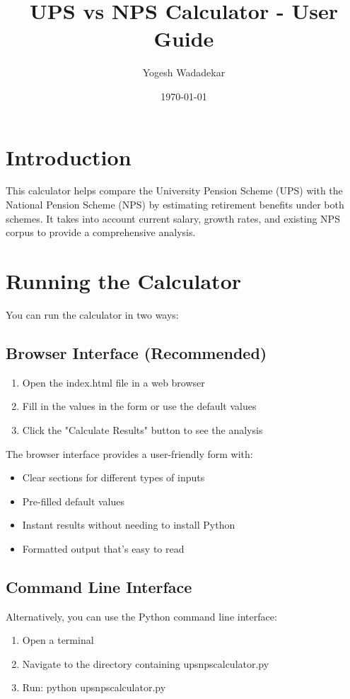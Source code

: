 \documentclass{article}
\title{UPS vs NPS Calculator - User Guide}
\author{Yogesh Wadadekar}
\date{\today}
\begin{document}
\maketitle

\section{Introduction}
This calculator helps compare the University Pension Scheme (UPS) with the National Pension Scheme (NPS) by estimating retirement benefits under both schemes. It takes into account current salary, growth rates, and existing NPS corpus to provide a comprehensive analysis.

\section{Running the Calculator}
You can run the calculator in two ways:

\subsection{Browser Interface (Recommended)}
\begin{enumerate}
    \item Open the index.html file in a web browser
    \item Fill in the values in the form or use the default values
    \item Click the "Calculate Results" button to see the analysis
\end{enumerate}

The browser interface provides a user-friendly form with:
\begin{itemize}
    \item Clear sections for different types of inputs
    \item Pre-filled default values
    \item Instant results without needing to install Python
    \item Formatted output that's easy to read
\end{itemize}

\subsection{Command Line Interface}
Alternatively, you can use the Python command line interface:
\begin{enumerate}
    \item Open a terminal
    \item Navigate to the directory containing upsnpscalculator.py
    \item Run: python upsnpscalculator.py
\end{enumerate}
\end{document}
